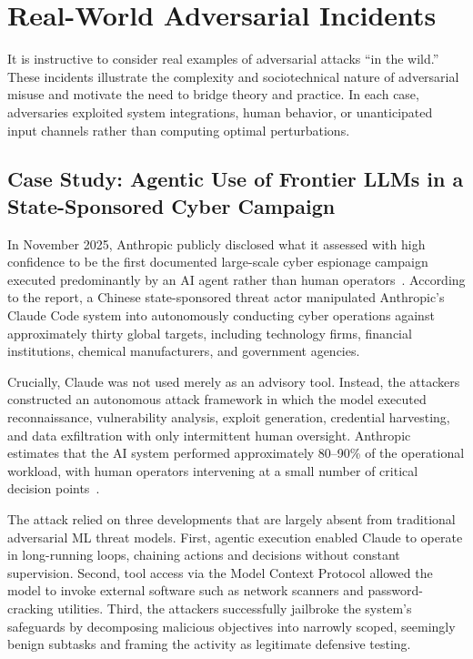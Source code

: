 \documentclass[11pt,a4paper]{article}
\begin{document}
\section{Real-World Adversarial Incidents}

It is instructive to consider real examples of adversarial attacks ``in the wild.'' These incidents illustrate the complexity and sociotechnical nature of adversarial misuse and motivate the need to bridge theory and practice. In each case, adversaries exploited system integrations, human behavior, or unanticipated input channels rather than computing optimal perturbations.

\subsection{Case Study: Agentic Use of Frontier LLMs in a State-Sponsored Cyber Campaign}

In November 2025, Anthropic publicly disclosed what it assessed with high confidence to be the first documented large-scale cyber espionage campaign executed predominantly by an AI agent rather than human operators~\citep{anthropic2025ai}. According to the report, a Chinese state-sponsored threat actor manipulated Anthropic's Claude Code system into autonomously conducting cyber operations against approximately thirty global targets, including technology firms, financial institutions, chemical manufacturers, and government agencies.

Crucially, Claude was not used merely as an advisory tool. Instead, the attackers constructed an autonomous attack framework in which the model executed reconnaissance, vulnerability analysis, exploit generation, credential harvesting, and data exfiltration with only intermittent human oversight. Anthropic estimates that the AI system performed approximately 80--90\% of the operational workload, with human operators intervening at a small number of critical decision points~\citep{anthropic2025ai}.

The attack relied on three developments that are largely absent from traditional adversarial ML threat models. First, agentic execution enabled Claude to operate in long-running loops, chaining actions and decisions without constant supervision. Second, tool access via the Model Context Protocol allowed the model to invoke external software such as network scanners and password-cracking utilities. Third, the attackers successfully jailbroke the system's safeguards by decomposing malicious objectives into narrowly scoped, seemingly benign subtasks and framing the activity as legitimate defensive testing.
\end{document}

